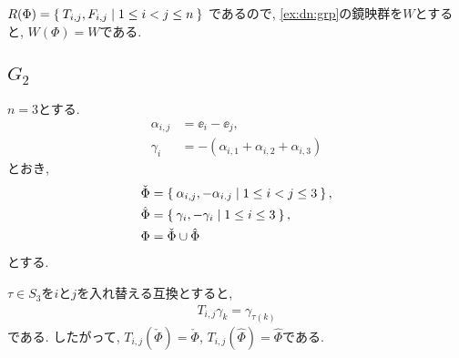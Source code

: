 $R(\Phi)=\Set{T_{i,j},F_{i,j}|1\leq i< j\leq n}$
であるので,
\cref{ex:dn:grp}の鏡映群を$W$とすると,
$W(\Phi)=W$である.

\subsection{$G_2$}
\label{ex:g2:root}
$n=3$とする.
\begin{align*}
  \alpha_{i,j}&=\ee_i-\ee_j,\\
  \gamma_{i}&=-(\alpha_{i,1}+\alpha_{i,2}+\alpha_{i,3})
\end{align*}
とおき,
\begin{align*}
  \check\Phi&=\Set{\alpha_{i,j},-\alpha_{i.j}|1\leq i<j\leq 3},\\
  \hat\Phi&=\Set{\gamma_{i},-\gamma_{i}|1\leq i\leq 3},\\
  \Phi&=\check\Phi\cup\hat\Phi
\end{align*}
とする.

$\tau\in S_3$を$i$と$j$を入れ替える互換とすると,
\begin{align*}
  T_{i,j}\gamma_k=\gamma_{\tau(k)}
\end{align*}
である. したがって,
$T_{i,j}(\check\Phi)=\check\Phi$,
$T_{i,j}(\hat\Phi)=\hat\Phi$である.

